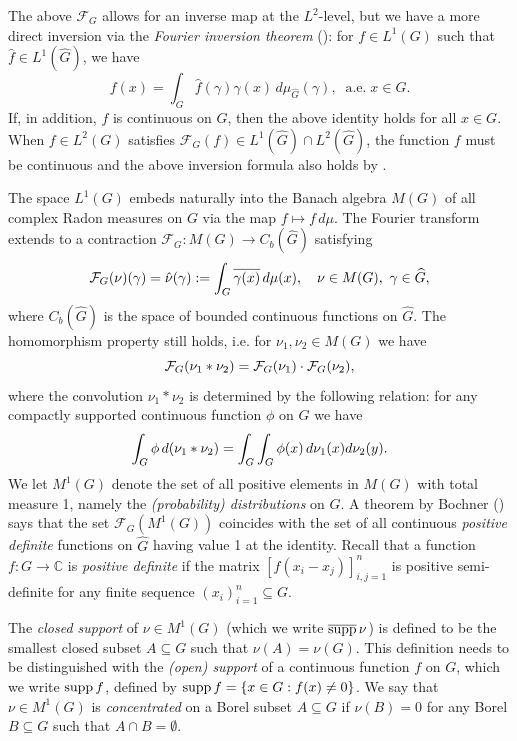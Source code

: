 \documentclass[12pt,reqno]{amsart}
\theoremstyle{definition}
\theoremstyle{definition}
\theoremstyle{definition}
\numberwithin{thm}{section}
\numberwithin{equation}{section}
\newcommand{\Comp}{\mathbb{C}}
\newcommand{\F}{\mathcal{F}}
\newcommand{\wh}[1]{\widehat{#1}}
\begin{document}
The above $\F_G$ allows for an inverse map at the $L^2$-level, but we have a more direct inversion via the {\em Fourier inversion theorem} (\cite[4.32]{Folland-book}): for $f\in L^1(G)$ such that $\hat{f} \in L^1(\wh{G})$, we have
    \begin{equation}\label{eq-Fourier-inversion}
        f(x) = \int_G \hat{f}(\gamma)\gamma(x)\, d\mu_{\wh{G}}(\gamma),\;\; \text{a.e.}\; x\in G.
    \end{equation}
If, in addition, $f$ is continuous on $G$, then the above identity holds for all $x\in G$. When $f\in L^2(G)$ satisfies $\F_G(f) \in L^1(\wh{G})\cap L^2(\wh{G})$, the function $f$ must be continuous and the above inversion formula also holds by \cite[Theorem 4.4.13]{ReiSte}.


The space $L^1(G)$ embeds naturally into the Banach algebra $M(G)$ of all complex Radon measures on $G$ via the map $f\mapsto f\,d\mu$. The Fourier transform extends to a contraction $\F_G:M(G)\rightarrow C_b(\wh{G})$ satisfying
    \begin{equation} \notag
        \F_G(\nu)(\gamma) = \hat{\nu}(\gamma) := \int_G \overline{\gamma(x)}\, d\mu(x), \ \ \ \nu \in M(G), \ \gamma \in \wh{G},
    \end{equation}
where $C_b(\wh{G})$ is the space of bounded continuous functions on $\wh{G}$. The homomorphism property still holds, i.e. for $\nu_1,\nu_2 \in M(G)$ we have
    \begin{equation}
    \notag     \F_G(\nu_1*\nu_2) = \F_G(\nu_1) \cdot \F_G(\nu_2),
    \end{equation}
    where the convolution $\nu_1*\nu_2$ is determined by the following relation: for any compactly supported continuous function $\phi$ on $G$ we have
    \begin{equation}
     \notag    \int_G \phi \,d(\nu_1*\nu_2) = \int_G\int_G\phi(x)\,d\nu_1(x)d\nu_2(y).
    \end{equation}
We let $M^1(G)$ denote the set of all positive elements in $M(G)$ with total measure 1, namely the {\em (probability) distributions} on $G$. A theorem by Bochner (\cite[33.3]{HewittRoss2}) says that the set $\F_G(M^1(G))$ coincides with the set of all continuous {\em positive definite} functions on $\wh{G}$ having value 1 at the identity. Recall that a function $f: G\to \Comp$ is {\em positive definite} if the matrix $[f(x_i-x_j)]^n_{i,j=1}$ is positive semi-definite for any finite sequence $(x_i)^n_{i=1}\subseteq G$.

The {\em closed support} of $\nu\in M^1(G)$ (which we write $\overline{{\rm supp}}\, \nu$) is defined to be the smallest closed subset $A\subseteq G$ such that $\nu(A) = \nu(G)$. This definition needs to be distinguished with the {\em (open) support} of a continuous function $f$ on $G$, which we write ${\rm supp}\, f$, defined by ${\rm supp}\, f = \{x\in G: f(x) \ne 0\}$. We say that $\nu\in M^1(G)$ is {\em concentrated} on a Borel subset $A\subseteq G$ if $\nu(B) = 0$ for any Borel $B\subseteq G$ such that $A\cap B = \emptyset$.
\end{document}
